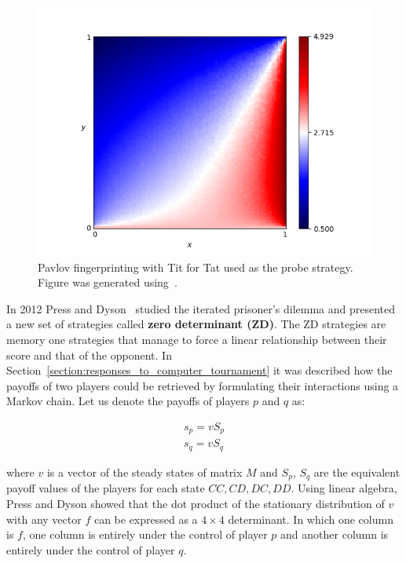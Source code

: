 \documentclass{article}
\theoremstyle{definition}
\begin{document}
\begin{figure}[!hbtp]
    \centering
    \includegraphics[height=.3\textheight]{./assets/images/Win-Stay_Lose-Shift.png}
    \caption{Pavlov fingerprinting with Tit for Tat used as the probe strategy.
    Figure was generated using~\cite{axelrodproject}.}
    \label{fig:fingerprinting}
\end{figure}

In 2012 Press and Dyson~\cite{Press2012} studied the iterated prisoner's dilemma and presented
a new set of strategies called \textbf{zero determinant (ZD)}. The ZD strategies
are memory one strategies that manage to force a linear relationship between their
score and that of the opponent.
In Section~\ref{section:responses_to_computer_tournament} it was described how
the payoffs of two players could be retrieved by formulating their interactions
using a Markov chain. Let us denote the payoffs of players \(p\) and \(q\) as:

\begin{align*}
    s_p = v S_p \\
    s_q = v S_q
\end{align*}

where \(v\) is a vector of the steady states of matrix \(M\) and \(S_p\), \(S_q\)
are the equivalent payoff values of the players for each state \(CC, CD, DC, DD\).
Using linear algebra, Press and Dyson showed that the dot product of the stationary
distribution of \(v\) with any vector \(f\) can be expressed as a \(4\times 4\)
determinant. In which one column is \(f\), one column is entirely under the control
of player \(p\) and another column is entirely under the control of player \(q\).
\end{document}
